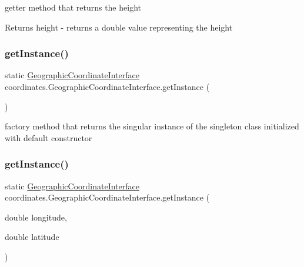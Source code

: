 getter method that returns the height 

\begin{DoxyReturn}{Returns}
height -\/ returns a double value representing the height 
\end{DoxyReturn}
\mbox{\label{classcoordinates_1_1_geographic_coordinate_interface_a954409872a73cc8c7fc49f87d17f88b5}} 
\subsubsection{\texorpdfstring{get\+Instance()}{getInstance()}\hspace{0.1cm}{\footnotesize\ttfamily [1/3]}}
{\footnotesize\ttfamily static \hyperlink{classcoordinates_1_1_geographic_coordinate_interface}{Geographic\+Coordinate\+Interface} coordinates.\+Geographic\+Coordinate\+Interface.\+get\+Instance (\begin{DoxyParamCaption}{ }\end{DoxyParamCaption})\hspace{0.3cm}{\ttfamily [static]}}



factory method that returns the singular instance of the singleton class initialized with default constructor 

\mbox{\label{classcoordinates_1_1_geographic_coordinate_interface_acb73fce8bcd43035599dd462dbee2509}} 
\subsubsection{\texorpdfstring{get\+Instance()}{getInstance()}\hspace{0.1cm}{\footnotesize\ttfamily [2/3]}}
{\footnotesize\ttfamily static \hyperlink{classcoordinates_1_1_geographic_coordinate_interface}{Geographic\+Coordinate\+Interface} coordinates.\+Geographic\+Coordinate\+Interface.\+get\+Instance (\begin{DoxyParamCaption}\item[{double}]{longitude,  }\item[{double}]{latitude }\end{DoxyParamCaption})\hspace{0.3cm}{\ttfamily [static]}}



